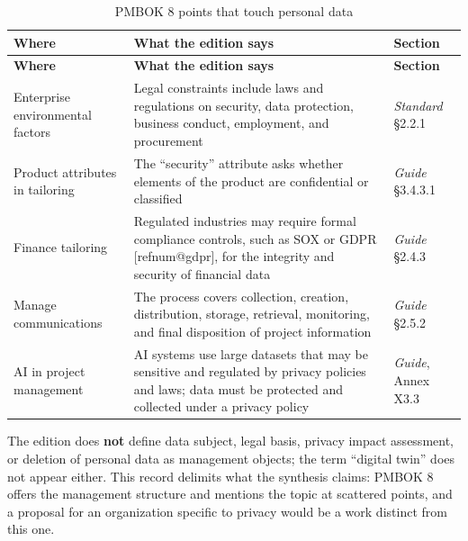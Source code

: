 \documentclass[12pt,a4paper,article,oneside,brazil,english]{abntex2}
\makeatletter
\newcommand{\fontetab}[1]{\par\vspace{3pt}{\small\noindent Source: #1\par}}
\newcommand{\refnum}[1]{\csname refnum@#1\endcsname}
\newcommand{\cit}[1]{[\refnum{#1}]}
\makeatother
\begin{document}
\begingroup\SingleSpacing\small
\begin{longtable}{@{}>{\raggedright\arraybackslash}p{}>{\raggedright\arraybackslash}p{}>{\raggedright\arraybackslash}p{}@{}}
\caption{PMBOK 8 points that touch personal data}\label{tab:t13}\\
\hline
\textbf{Where} & \textbf{What the edition says} & \textbf{Section}\\
\hline
\endfirsthead
\hline
\textbf{Where} & \textbf{What the edition says} & \textbf{Section}\\
\hline
\endhead
\hline
\endfoot
\hline
\endlastfoot
Enterprise environmental factors & Legal constraints include laws and regulations on security, data protection, business conduct, employment, and procurement & \textit{Standard} §2.2.1\\[3pt]
Product attributes in tailoring & The \textquotedblleft{}security\textquotedblright{} attribute asks whether elements of the product are confidential or classified & \textit{Guide} §3.4.3.1\\[3pt]
Finance tailoring & Regulated industries may require formal compliance controls, such as SOX or GDPR [\refnum{gdpr}], for the integrity and security of financial data & \textit{Guide} §2.4.3\\[3pt]
Manage communications & The process covers collection, creation, distribution, storage, retrieval, monitoring, and final disposition of project information & \textit{Guide} §2.5.2\\[3pt]
AI in project management & AI systems use large datasets that may be sensitive and regulated by privacy policies and laws; data must be protected and collected under a privacy policy & \textit{Guide}, Annex X3.3\\[3pt]
\end{longtable}
\endgroup
\fontetab{Prepared by the authors (2026), based on \cit{pmi}.}

The edition does \textbf{not} define data subject, legal basis, privacy impact assessment, or deletion of personal data as management objects; the term \textquotedblleft{}digital twin\textquotedblright{} does not appear either. This record delimits what the synthesis claims: PMBOK 8 offers the management structure and mentions the topic at scattered points, and a proposal for an organization specific to privacy would be a work distinct from this one.
\end{document}
